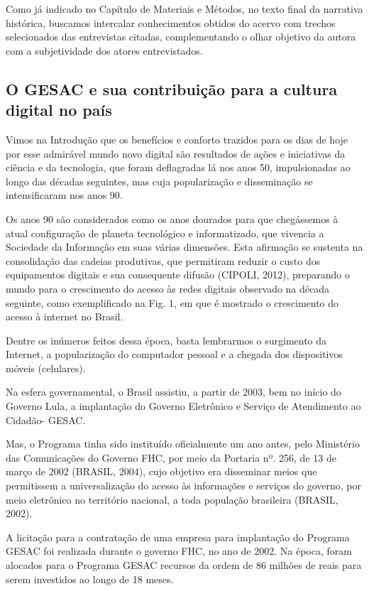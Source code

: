 Como já indicado no Capítulo de Materiais e Métodos, no texto final da narrativa histórica, buscamos intercalar conhecimentos obtidos do acervo com trechos selecionados das entrevistas citadas, complementando o olhar objetivo da autora com a subjetividade dos atores entrevistados.

\subsection[O GESAC e sua contribuição para  a cultura  digital  no país]{O GESAC e sua contribuição para  a cultura  digital  no país}\label{O GESAC e sua contribuição para  a cultura  digital  no país}
Vimos na Introdução que os benefícios e conforto trazidos para os dias de hoje por esse admirável mundo novo digital são resultados de ações e iniciativas da ciência e da tecnologia, que foram deflagradas lá nos anos 50, impulsionadas ao longo das décadas seguintes, mas cuja popularização e disseminação se intensificaram nos anos 90.

Os anos 90 são considerados como os anos dourados para que chegássemos à atual configuração de planeta tecnológico e informatizado, que vivencia a Sociedade da Informação em suas várias dimensões. Esta afirmação se sustenta na consolidação das cadeias produtivas, que permitiram reduzir o custo dos equipamentos digitais e sua consequente difusão (CIPOLI, 2012), preparando o mundo para o crescimento do acesso às redes digitais observado na década seguinte, como exemplificado na Fig. 1, em que é mostrado o crescimento do acesso à internet no Brasil.

Dentre os  inúmeros feitos dessa época, basta lembrarmos o surgimento da Internet, a popularização do computador pessoal e a chegada dos dispositivos móveis (celulares).

Na esfera governamental, o Brasil assistiu, a partir de 2003, bem no início do Governo Lula, a implantação do Governo Eletrônico e Serviço de Atendimento ao Cidadão- GESAC.

Mas, o Programa tinha sido instituído oficialmente um ano antes, pelo Ministério das Comunicações do Governo FHC, por meio  da Portaria nº. 256, de 13 de março de 2002 (BRASIL, 2004), cujo  objetivo era disseminar meios que permitissem a universalização do acesso às informações e serviços do governo, por meio eletrônico no território nacional, a toda população brasileira (BRASIL, 2002).

A licitação para a contratação de uma empresa para implantação do Programa GESAC foi realizada durante o governo FHC, no ano de 2002. Na época, foram alocados para o Programa GESAC recursos da ordem de 86 milhões de reais para serem investidos ao longo de 18 meses.


